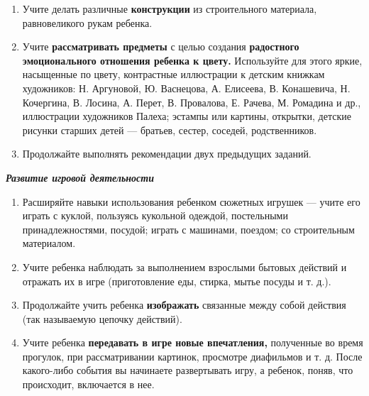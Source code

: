 \documentclass[a5paper]{book}
\renewcommand{\emph}[1]{\textit{#1}}
\begin{document}
\begin{enumerate}
\def\labelenumi{\arabic{enumi}.}
\setcounter{enumi}{1}
\item
  
  Учите делать различные \textbf{конструкции} из строительного
  материала, равновеликого рукам ребенка.
  
\item
  
  Учите \textbf{рассматривать предметы} с целью создания
  \textbf{радостного эмоционального отношения ребенка к цвету.}
  Используйте для этого яркие, насыщенные по цвету, контрастные
  иллюстрации к детским книжкам художников: Н. Аргуновой, Ю. Васнецова,
  А. Елисеева, В. Конашевича, Н. Кочергина, В. Лосина, А. Перет, В.
  Провалова, Е. Рачева, М. Ромадина и др., иллюстрации художников
  Палеха; эстампы или картины, открытки, детские рисунки старших детей
  --- братьев, сестер, соседей, родственников.
  
\item
  
  Продолжайте выполнять рекомендации двух предыдущих заданий.
  
\end{enumerate}


\emph{\textbf{Развитие игровой деятельности}}


\begin{enumerate}
\def\labelenumi{\arabic{enumi}.}
\item
  
  Расширяйте навыки использования ребенком сюжетных игрушек --- учите
  его играть с куклой, пользуясь кукольной одеждой, постельными
  принадлежностями, посудой; играть с машинами, поездом; со строительным
  материалом.
  
\item
  
  Учите ребенка наблюдать за выполнением взрослыми бытовых действий и
  отражать их в игре (приготовление еды, стирка, мытье посуды и т. д.).
  
\item
  
  Продолжайте учить ребенка \textbf{изображать} связанные между собой
  действия (так называемую цепочку действий).
  
\item
  
  Учите ребенка \textbf{передавать в игре новые впечатления,} полученные
  во время прогулок, при рассматривании картинок, просмотре диафильмов и
  т. д. После какого-либо события вы начинаете развертывать игру, а
  ребенок, поняв, что происходит, включается в нее.
  
\end{enumerate}
\end{document}

